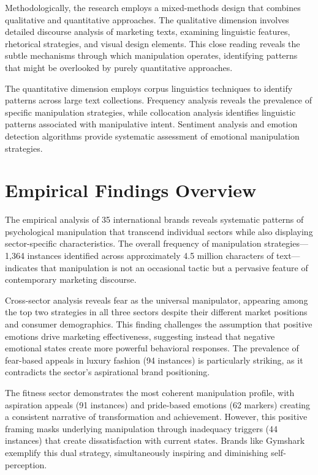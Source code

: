 Methodologically, the research employs a mixed-methods design that combines qualitative and quantitative approaches. The qualitative dimension involves detailed discourse analysis of marketing texts, examining linguistic features, rhetorical strategies, and visual design elements. This close reading reveals the subtle mechanisms through which manipulation operates, identifying patterns that might be overlooked by purely quantitative approaches.

The quantitative dimension employs corpus linguistics techniques to identify patterns across large text collections. Frequency analysis reveals the prevalence of specific manipulation strategies, while collocation analysis identifies linguistic patterns associated with manipulative intent. Sentiment analysis and emotion detection algorithms provide systematic assessment of emotional manipulation strategies.

\section{Empirical Findings Overview}
\label{sec:findings_overview}

The empirical analysis of 35 international brands reveals systematic patterns of psychological manipulation that transcend individual sectors while also displaying sector-specific characteristics. The overall frequency of manipulation strategies—1,364 instances identified across approximately 4.5 million characters of text—indicates that manipulation is not an occasional tactic but a pervasive feature of contemporary marketing discourse.

Cross-sector analysis reveals fear as the universal manipulator, appearing among the top two strategies in all three sectors despite their different market positions and consumer demographics. This finding challenges the assumption that positive emotions drive marketing effectiveness, suggesting instead that negative emotional states create more powerful behavioral responses. The prevalence of fear-based appeals in luxury fashion (94 instances) is particularly striking, as it contradicts the sector's aspirational brand positioning.

The fitness sector demonstrates the most coherent manipulation profile, with aspiration appeals (91 instances) and pride-based emotions (62 markers) creating a consistent narrative of transformation and achievement. However, this positive framing masks underlying manipulation through inadequacy triggers (44 instances) that create dissatisfaction with current states. Brands like Gymshark exemplify this dual strategy, simultaneously inspiring and diminishing self-perception.

